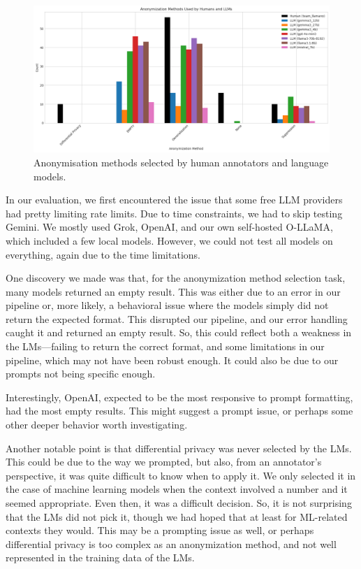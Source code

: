 \documentclass{article}
\begin{document}
\begin{figure}[!htbp]
    \centering
    \includegraphics[width=\linewidth]{images/plot_eval.png}
    \caption{Anonymisation methods selected by human annotators and language models.}
    \label{fig:anonymization}
\end{figure}


In our evaluation, we first encountered the issue that some free LLM providers had pretty limiting rate limits. Due to time constraints, we had to skip testing Gemini. We mostly used Grok, OpenAI, and our own self-hosted O-LLaMA, which included a few local models. However, we could not test all models on everything, again due to the time limitations.

One discovery we made was that, for the anonymization method selection task, many models returned an empty result. This was either due to an error in our pipeline or, more likely, a behavioral issue where the models simply did not return the expected format. This disrupted our pipeline, and our error handling caught it and returned an empty result. So, this could reflect both a weakness in the LMs—failing to return the correct format, and some limitations in our pipeline, which may not have been robust enough. It could also be due to our prompts not being specific enough.

Interestingly, OpenAI, expected to be the most responsive to prompt formatting, had the most empty results. This might suggest a prompt issue, or perhaps some other deeper behavior worth investigating.

Another notable point is that differential privacy was never selected by the LMs. This could be due to the way we prompted, but also, from an annotator’s perspective, it was quite difficult to know when to apply it. We only selected it in the case of machine learning models when the context involved a number and it seemed appropriate. Even then, it was a difficult decision. So, it is not surprising that the LMs did not pick it, though we had hoped that at least for ML-related contexts they would. This may be a prompting issue as well, or perhaps differential privacy is too complex as an anonymization method, and not well represented in the training data of the LMs.
\end{document}

